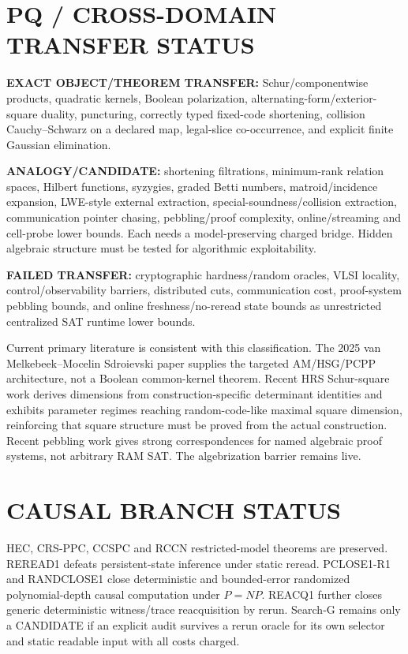 \documentclass[11pt]{article}
\begin{document}
\section*{PQ / CROSS-DOMAIN TRANSFER STATUS}
\textbf{EXACT OBJECT/THEOREM TRANSFER:} Schur/componentwise products, quadratic kernels, Boolean polarization, alternating-form/exterior-square duality, puncturing, correctly typed fixed-code shortening, collision Cauchy--Schwarz on a declared map, legal-slice co-occurrence, and explicit finite Gaussian elimination.

\textbf{ANALOGY/CANDIDATE:} shortening filtrations, minimum-rank relation spaces, Hilbert functions, syzygies, graded Betti numbers, matroid/incidence expansion, LWE-style external extraction, special-soundness/collision extraction, communication pointer chasing, pebbling/proof complexity, online/streaming and cell-probe lower bounds. Each needs a model-preserving charged bridge. Hidden algebraic structure must be tested for algorithmic exploitability.

\textbf{FAILED TRANSFER:} cryptographic hardness/random oracles, VLSI locality, control/observability barriers, distributed cuts, communication cost, proof-system pebbling bounds, and online freshness/no-reread state bounds as unrestricted centralized SAT runtime lower bounds.

Current primary literature is consistent with this classification. The 2025 van Melkebeek--Mocelin Sdroievski paper supplies the targeted AM/HSG/PCPP architecture, not a Boolean common-kernel theorem. Recent HRS Schur-square work derives dimensions from construction-specific determinant identities and exhibits parameter regimes reaching random-code-like maximal square dimension, reinforcing that square structure must be proved from the actual construction. Recent pebbling work gives strong correspondences for named algebraic proof systems, not arbitrary RAM SAT. The algebrization barrier remains live.

\section*{CAUSAL BRANCH STATUS}
HEC, CRS-PPC, CCSPC and RCCN restricted-model theorems are preserved. REREAD1 defeats persistent-state inference under static reread. PCLOSE1-R1 and RANDCLOSE1 close deterministic and bounded-error randomized polynomial-depth causal computation under \(P=NP\). REACQ1 further closes generic deterministic witness/trace reacquisition by rerun. Search-G remains only a CANDIDATE if an explicit audit survives a rerun oracle for its own selector and static readable input with all costs charged.
\end{document}
